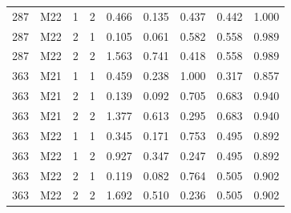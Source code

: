 \begin{longtable}{llrrrrrrr}
287 & M22 & 1 & 2 & 0.466 & 0.135 & 0.437 & 0.442 & 1.000 \\
287 & M22 & 2 & 1 & 0.105 & 0.061 & 0.582 & 0.558 & 0.989 \\
287 & M22 & 2 & 2 & 1.563 & 0.741 & 0.418 & 0.558 & 0.989 \\
363 & M21 & 1 & 1 & 0.459 & 0.238 & 1.000 & 0.317 & 0.857 \\
363 & M21 & 2 & 1 & 0.139 & 0.092 & 0.705 & 0.683 & 0.940 \\
363 & M21 & 2 & 2 & 1.377 & 0.613 & 0.295 & 0.683 & 0.940 \\
363 & M22 & 1 & 1 & 0.345 & 0.171 & 0.753 & 0.495 & 0.892 \\
363 & M22 & 1 & 2 & 0.927 & 0.347 & 0.247 & 0.495 & 0.892 \\
363 & M22 & 2 & 1 & 0.119 & 0.082 & 0.764 & 0.505 & 0.902 \\
363 & M22 & 2 & 2 & 1.692 & 0.510 & 0.236 & 0.505 & 0.902 \\
\bottomrule\end{longtable}
